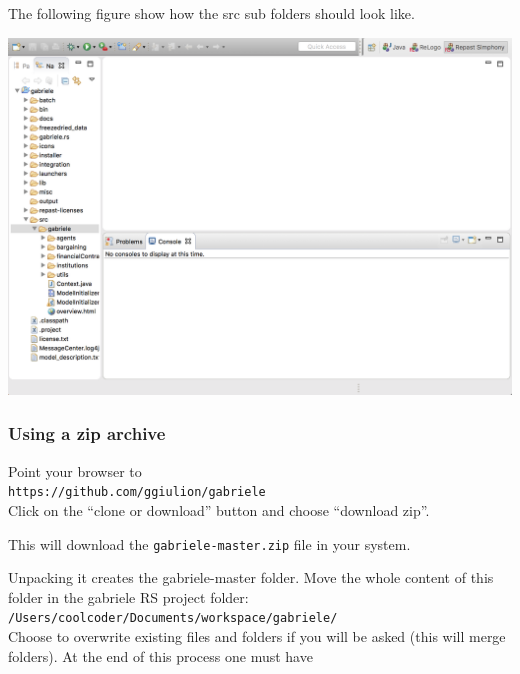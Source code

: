 \documentclass{book}
\begin{document}
The following figure show how the src sub folders should look like.

\vskip2mm
\noindent
\includegraphics[scale=0.35]{fig_gabriele_rs_navigation1}

\vskip2mm

\subsubsection{Using a zip archive}

Point your browser to\\ 
\verb+https://github.com/ggiulion/gabriele+\\
Click on the ``clone or download'' button and choose ``download zip''.

This will download the \verb+gabriele-master.zip+ file in your system.

Unpacking it creates the gabriele-master folder.
Move the whole content of this folder in the gabriele RS project folder:\\  
\verb+/Users/coolcoder/Documents/workspace/gabriele/+\\
Choose to overwrite existing files and folders if you will be asked (this will merge folders). 
\iffalse
At the end of this process one must have
\end{document}
